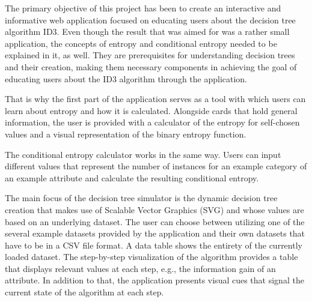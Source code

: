 
The primary objective of this project has been to create an interactive and informative web application focused on educating users about the decision tree algorithm ID3. Even though the result that was aimed for was a rather small application, the concepts of entropy and conditional entropy needed to be explained in it, as well. They are prerequisites for understanding decision trees and their creation, making them necessary components in achieving the goal of educating users about the ID3 algorithm through the application.

That is why the first part of the application serves as a tool with which users can learn about entropy and how it is calculated. Alongside cards that hold general information, the user is provided with a calculator of the entropy for self-chosen values and a visual representation of the binary entropy function.

The conditional entropy calculator works in the same way. Users can input different values that represent the number of instances for an example category of an example attribute and calculate the resulting conditional entropy.

The main focus of the decision tree simulator is the dynamic decision tree creation that makes use of Scalable Vector Graphics (SVG) and whose values are based on an underlying dataset. The user can choose between utilizing one of the several example datasets provided by the application and their own datasets that have to be in a CSV file format. A data table shows the entirety of the currently loaded dataset. The step-by-step visualization of the algorithm provides a table that displays relevant values at each step, e.g., the information gain of an attribute. In addition to that, the application presents visual cues that signal the current state of the algorithm at each step.